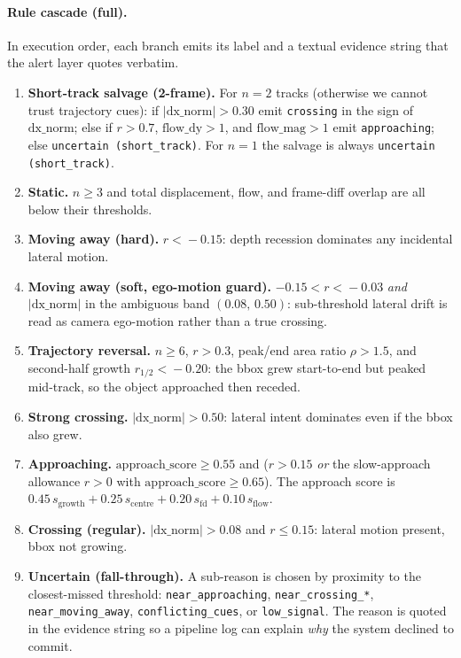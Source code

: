 \documentclass[10pt,twocolumn,letterpaper]{article}
\begin{document}
\paragraph{Rule cascade (full).} In execution order, each branch
emits its label and a textual evidence string that the alert layer
quotes verbatim.

\begin{enumerate}[topsep=2pt,itemsep=1pt]
  \item \textbf{Short-track salvage (2-frame).} For $n\!=\!2$ tracks
    (otherwise we cannot trust trajectory cues): if
    $|\textrm{dx\_norm}|\!>\!0.30$ emit \texttt{crossing} in the sign
    of $\textrm{dx\_norm}$; else if $r\!>\!0.7$, $\textrm{flow\_dy}\!>\!1$,
    and $\textrm{flow\_mag}\!>\!1$ emit \texttt{approaching}; else
    \texttt{uncertain (short\_track)}. For $n\!=\!1$ the salvage is
    always \texttt{uncertain (short\_track)}.
  \item \textbf{Static.} $n\!\ge\!3$ and total displacement, flow, and
    frame-diff overlap are all below their thresholds.
  \item \textbf{Moving away (hard).} $r\!<\!-0.15$: depth recession
    dominates any incidental lateral motion.
  \item \textbf{Moving away (soft, ego-motion guard).}
    $-0.15\!<\!r\!<\!-0.03$ \emph{and} $|\textrm{dx\_norm}|$ in the
    ambiguous band $(0.08,\,0.50)$: sub-threshold lateral drift is
    read as camera ego-motion rather than a true crossing.
  \item \textbf{Trajectory reversal.} $n\!\ge\!6$, $r\!>\!0.3$,
    peak/end area ratio $\rho\!>\!1.5$, and second-half growth
    $r_{1/2}\!<\!-0.20$: the bbox grew start-to-end but peaked
    mid-track, so the object approached then receded.
  \item \textbf{Strong crossing.} $|\textrm{dx\_norm}|\!>\!0.50$: lateral
    intent dominates even if the bbox also grew.
  \item \textbf{Approaching.} $\textrm{approach\_score}\ge\!0.55$ and
    ($r\!>\!0.15$ \emph{or} the slow-approach allowance $r\!>\!0$
    with $\textrm{approach\_score}\ge\!0.65$). The approach score is
    $0.45\,s_{\textrm{growth}}+0.25\,s_{\textrm{centre}}+
    0.20\,s_{\textrm{fd}}+0.10\,s_{\textrm{flow}}$.
  \item \textbf{Crossing (regular).} $|\textrm{dx\_norm}|\!>\!0.08$ and
    $r\!\le\!0.15$: lateral motion present, bbox not growing.
  \item \textbf{Uncertain (fall-through).} A sub-reason is chosen by
    proximity to the closest-missed threshold:
    \texttt{near\_approaching}, \texttt{near\_crossing\_*},
    \texttt{near\_moving\_away}, \texttt{conflicting\_cues}, or
    \texttt{low\_signal}. The reason is quoted in the evidence
    string so a pipeline log can explain \emph{why} the system
    declined to commit.
\end{enumerate}
\end{document}
